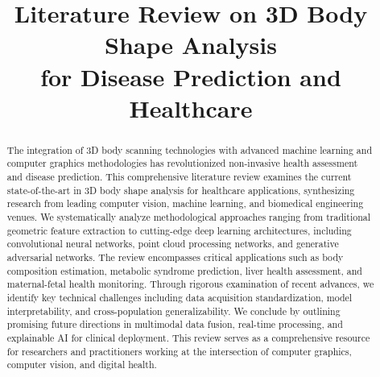 \documentclass[conference, 12pt]{IEEEtran}
\begin{document}
\title{
Literature Review on 3D Body Shape Analysis \\
for Disease Prediction and Healthcare 
}

\author{




}
\maketitle

\begin{abstract}
The integration of 3D body scanning technologies with advanced machine learning and computer graphics methodologies has revolutionized non-invasive health assessment and disease prediction. This comprehensive literature review examines the current state-of-the-art in 3D body shape analysis for healthcare applications, synthesizing research from leading computer vision, machine learning, and biomedical engineering venues. We systematically analyze methodological approaches ranging from traditional geometric feature extraction to cutting-edge deep learning architectures, including convolutional neural networks, point cloud processing networks, and generative adversarial networks. The review encompasses critical applications such as body composition estimation, metabolic syndrome prediction, liver health assessment, and maternal-fetal health monitoring. Through rigorous examination of recent advances, we identify key technical challenges including data acquisition standardization, model interpretability, and cross-population generalizability. We conclude by outlining promising future directions in multimodal data fusion, real-time processing, and explainable AI for clinical deployment. This review serves as a comprehensive resource for researchers and practitioners working at the intersection of computer graphics, computer vision, and digital health.
\end{abstract}
\end{document}
